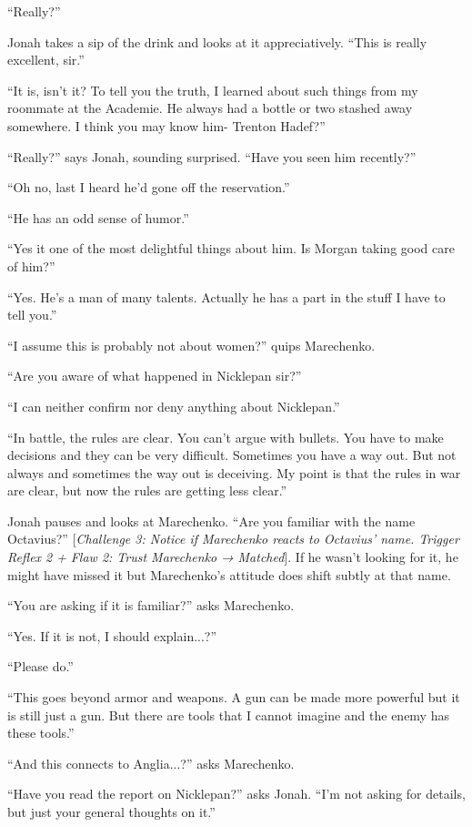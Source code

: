 ``Really?''

Jonah takes a sip of the drink and looks at it appreciatively.  ``This is really excellent, sir.''

``It is, isn't it?  To tell you the truth, I learned about such things from my roommate at the Academie.  He always had a bottle or two stashed away somewhere.  I think you may know him- Trenton Hadef?''

``Really?'' says Jonah, sounding surprised.  ``Have you seen him recently?''

``Oh no, last I heard he'd gone off the reservation.''

``He has an odd sense of humor.''

``Yes it one of the most delightful things about him.  Is Morgan taking good care of him?''

``Yes.  He's a man of many talents. Actually he has a part in the stuff I have to tell you.''

``I assume this is probably not about women?'' quips Marechenko.

``Are you aware of what happened in Nicklepan sir?''

``I can neither confirm nor deny anything about Nicklepan.''

``In battle, the rules are clear.  You can't argue with bullets.  You have to make decisions and they can be very difficult.  Sometimes you have a way out.  But not always and sometimes the way out is deceiving.  My point is that the rules in war are clear, but now the rules are getting less clear.''

Jonah pauses and looks at Marechenko.  ``Are you familiar with the name Octavius?''  {[}\textit{Challenge 3: Notice if Marechenko reacts to Octavius' name.  Trigger Reflex 2 + }\textit{ {\color[RGB]{255,0,0}Flaw 2: Trust Marechenko} }\textit{ → Matched}{]}.  If he wasn't looking for it, he might have missed it but Marechenko's attitude does shift subtly at that name.

``You are asking if it is familiar?'' asks Marechenko.

``Yes.  If it is not, I should explain...?''

``Please do.''

``This goes beyond armor and weapons.  A gun can be made more powerful but it is still just a gun.  But there are tools that I cannot imagine and the enemy has these tools.''

``And this connects to Anglia...?'' asks Marechenko.

``Have you read the report on Nicklepan?'' asks Jonah.  ``I'm not asking for details, but just your general thoughts on it.''

